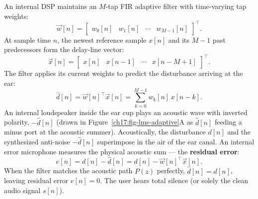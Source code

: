 An internal DSP maintains an $M$-tap FIR adaptive filter with time-varying tap weights:
\begin{equation}
  \vec{w}[n] = \begin{bmatrix} w_0[n] & w_1[n] & \cdots & w_{M-1}[n] \end{bmatrix}^\top .
  \label{ch17:eq-w-vec}
\end{equation}
At sample time $n$, the newest reference sample $x[n]$ and its $M-1$ past predecessors form the delay-line vector:
\begin{equation}
  \vec{x}[n] = \begin{bmatrix} x[n] & x[n-1] & \cdots & x[n-M+1] \end{bmatrix}^\top .
  \label{ch17:eq-x-vec}
\end{equation}
The filter applies its current weights to predict the disturbance arriving at the ear:
\begin{equation}
  \hat{d}[n] = \vec{w}[n]^\top \vec{x}[n] = \sum_{k=0}^{M-1} w_k[n]\, x[n-k] .
  \label{ch17:eq-d-hat}
\end{equation}
An internal loudspeaker inside the ear cup plays an acoustic wave with inverted polarity, $-\hat{d}[n]$ (drawn in Figure~\ref{ch17:fig-lms-adaptive}A as $\hat{d}[n]$ feeding a minus port at the acoustic summer). Acoustically, the disturbance $d[n]$ and the synthesized anti-noise $-\hat{d}[n]$ superimpose in the air of the ear canal. An internal error microphone measures the physical acoustic sum --- the \textbf{residual error}:
\begin{equation}
  e[n] = d[n] - \hat{d}[n] = d[n] - \vec{w}[n]^\top \vec{x}[n] .
  \label{ch17:eq-error}
\end{equation}
When the filter matches the acoustic path $P(z)$ perfectly, $\hat{d}[n] = d[n]$, leaving residual error $e[n] = 0$. The user hears total silence (or solely the clean audio signal $s[n]$).

